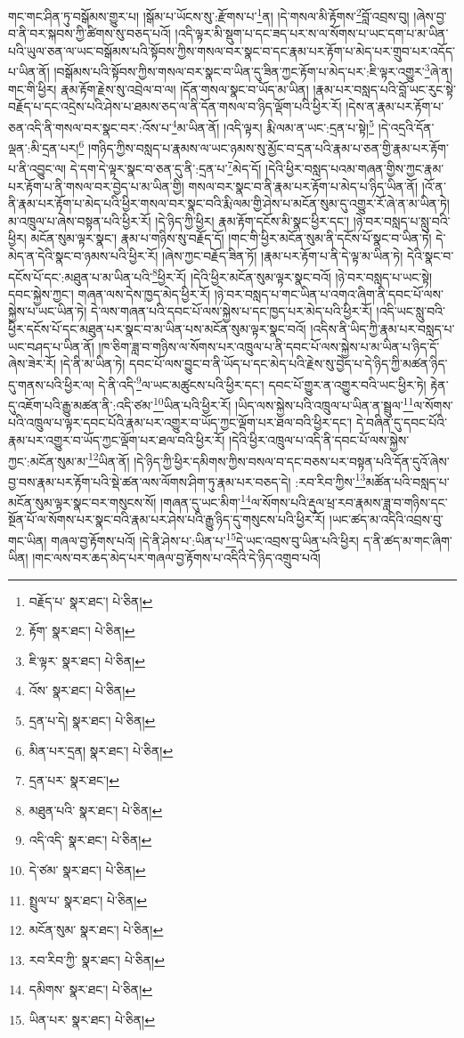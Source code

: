 གང་གང་ཤིན་ཏུ་བསྒོམས་གྱུར་པ། །སྒོམ་པ་ཡོངས་སུ་:རྫོགས་པ་\footnote{བརྗོད་པ་  སྣར་ཐང་།  པེ་ཅིན། }ན། །དེ་གསལ་མི་རྟོགས་\footnote{རྟོག་  སྣར་ཐང་།  པེ་ཅིན། }བློ་འབྲས་བུ། །ཞེས་བྱ་བ་ནི་བར་སྐབས་ཀྱི་ཚིགས་སུ་བཅད་པའོ། །འདི་ལྟར་མི་སྡུག་པ་དང་ཟད་པར་ས་ལ་སོགས་པ་ཡང་དག་པ་མ་ཡིན་པའི་ཡུལ་ཅན་ལ་ཡང་བསྒོམས་པའི་སྟོབས་ཀྱིས་གསལ་བར་སྣང་བ་དང་རྣམ་པར་རྟོག་པ་མེད་པར་གྲུབ་པར་འདོད་པ་ཡིན་ནོ། །བསྒོམས་པའི་སྟོབས་ཀྱིས་གསལ་བར་སྣང་བ་ཡིན་དུ་ཟིན་ཀྱང་རྟོག་པ་མེད་པར་:ཇི་ལྟར་འགྱུར་\footnote{ཇི་ལྟར་  སྣར་ཐང་།  པེ་ཅིན། }ཞེ་ན། གང་གི་ཕྱིར། རྣམ་རྟོག་རྗེས་སུ་འབྲེལ་བ་ལ། །དོན་གསལ་སྣང་བ་ཡོད་མ་ཡིན། །རྣམ་པར་བསླད་པའི་བློ་ཡང་རུང་སྟེ་བརྗོད་པ་དང་འདྲེས་པའི་ཤེས་པ་ཐམས་ཅད་ལ་ནི་དོན་གསལ་བ་ཉིད་ལྡོག་པའི་ཕྱིར་རོ། །དེས་ན་རྣམ་པར་རྟོག་པ་ཅན་འདི་ནི་གསལ་བར་སྣང་བར་:འོས་པ་\footnote{འོས་  སྣར་ཐང་།  པེ་ཅིན། }མ་ཡིན་ནོ། །འདི་ལྟར། རྨི་ལམ་ན་ཡང་:དྲན་པ་སྟེ།\footnote{དྲན་པ་དེ།  སྣར་ཐང་།  པེ་ཅིན། } །དེ་འདྲའི་དོན་ལྡན་:མི་དྲན་པར།\footnote{མིན་པར་དྲན།  སྣར་ཐང་།  པེ་ཅིན། } །གཉིད་ཀྱིས་བསླད་པ་རྣམས་ལ་ཡང་ཉམས་སུ་མྱོང་བ་དྲན་པའི་རྣམ་པ་ཅན་གྱི་རྣམ་པར་རྟོག་པ་ནི་འབྱུང་ལ། དེ་དག་དེ་ལྟར་སྣང་བ་ཅན་དུ་ནི་:དྲན་པ་\footnote{དྲན་པར་  སྣར་ཐང་། }མེད་དོ། །དེའི་ཕྱིར་བསླད་པའམ་གཞན་གྱིས་ཀྱང་རྣམ་པར་རྟོག་པ་ནི་གསལ་བར་བྱེད་པ་མ་ཡིན་གྱི། གསལ་བར་སྣང་བ་ནི་རྣམ་པར་རྟོག་པ་མེད་པ་ཉིད་ཡིན་ནོ། །འོ་ན་ནི་རྣམ་པར་རྟོག་པ་མེད་པའི་ཕྱིར་གསལ་བར་སྣང་བའི་རྨི་ལམ་གྱི་ཤེས་པ་མངོན་སུམ་དུ་འགྱུར་རོ་ཞེ་ན་མ་ཡིན་ཏེ། མ་འཁྲུལ་པ་ཞེས་བསྟན་པའི་ཕྱིར་རོ། །དེ་ཉིད་ཀྱི་ཕྱིར། རྣམ་རྟོག་དངོས་མི་སྣང་ཕྱིར་དང་། །ཉེ་བར་བསླད་པ་སླུ་བའི་ཕྱིར། མངོན་སུམ་ལྟར་སྣང་། རྣམ་པ་གཉིས་སུ་བརྗོད་དོ། །གང་གི་ཕྱིར་མངོན་སུམ་ནི་དངོས་པོ་སྣང་བ་ཡིན་ཏེ། དེ་མེད་ན་དེའི་སྣང་བ་ཉམས་པའི་ཕྱིར་རོ། །ཞེས་ཀྱང་བརྗོད་ཟིན་ཏོ། །རྣམ་པར་རྟོག་པ་ནི་དེ་ལྟ་མ་ཡིན་ཏེ། དེའི་སྣང་བ་དངོས་པོ་དང་:མཐུན་པ་མ་ཡིན་པའི་\footnote{མཐུན་པའི་  སྣར་ཐང་།  པེ་ཅིན། }ཕྱིར་རོ། །དེའི་ཕྱིར་མངོན་སུམ་ལྟར་སྣང་བའོ། །ཉེ་བར་བསླད་པ་ཡང་སྟེ། དབང་སྐྱེས་ཀྱང་། གཞན་ལས་དེས་ཁྱད་མེད་ཕྱིར་རོ། །ཉེ་བར་བསླད་པ་གང་ཡིན་པ་འགའ་ཞིག་ནི་དབང་པོ་ལས་སྐྱེས་པ་ཡང་ཡིན་ཏེ། དེ་ལས་གཞན་པའི་དབང་པོ་ལས་སྐྱེས་པ་དང་ཁྱད་པར་མེད་པའི་ཕྱིར་རོ། །འདི་ཡང་སླུ་བའི་ཕྱིར་དངོས་པོ་དང་མཐུན་པར་སྣང་བ་མ་ཡིན་པས་མངོན་སུམ་ལྟར་སྣང་བའོ། །འདིས་ནི་ཡིད་ཀྱི་རྣམ་པར་བསླད་པ་ཡང་བཤད་པ་ཡིན་ནོ། །ཁ་ཅིག་ཟླ་བ་གཉིས་ལ་སོགས་པར་འཁྲུལ་པ་ནི་དབང་པོ་ལས་སྐྱེས་པ་མ་ཡིན་པ་ཉིད་དོ་ཞེས་ཟེར་རོ། །དེ་ནི་མ་ཡིན་ཏེ། དབང་པོ་ལས་བྱུང་བ་ནི་ཡོད་པ་དང་མེད་པའི་རྗེས་སུ་བྱེད་པ་དེ་ཉིད་ཀྱི་མཚན་ཉིད་དུ་གནས་པའི་ཕྱིར་ལ། དེ་ནི་འདི་\footnote{འདི་འདི་  སྣར་ཐང་།  པེ་ཅིན། }ལ་ཡང་མཚུངས་པའི་ཕྱིར་དང་། དབང་པོ་གྱུར་ན་འགྱུར་བའི་ཡང་ཕྱིར་ཏེ། རྟེན་དུ་འཇོག་པའི་རྒྱུ་མཚན་ནི་:འདི་ཙམ་\footnote{དེ་ཙམ་  སྣར་ཐང་།  པེ་ཅིན། }ཡིན་པའི་ཕྱིར་རོ། །ཡིད་ལས་སྐྱེས་པའི་འཁྲུལ་པ་ཡིན་ན་སྦྲུལ་\footnote{སྤྲུལ་པ་  སྣར་ཐང་།  པེ་ཅིན། }ལ་སོགས་པའི་འཁྲུལ་པ་ལྟར་དབང་པོའི་རྣམ་པར་འགྱུར་བ་ཡོད་ཀྱང་ལྡོག་པར་ཐལ་བའི་ཕྱིར་དང་། དེ་བཞིན་དུ་དབང་པོའི་རྣམ་པར་འགྱུར་བ་ཡོད་ཀྱང་ལྡོག་པར་ཐལ་བའི་ཕྱིར་རོ། །དེའི་ཕྱིར་འཁྲུལ་པ་འདི་ནི་དབང་པོ་ལས་སྐྱེས་ཀྱང་:མངོན་སུམ་མ་\footnote{མངོན་སུམ་  སྣར་ཐང་།  པེ་ཅིན། }ཡིན་ནོ། །དེ་ཉིད་ཀྱི་ཕྱིར་དམིགས་ཀྱིས་བསལ་བ་དང་བཅས་པར་བསྟན་པའི་དོན་དུའོ་ཞེས་བྱ་བས་རྣམ་པར་རྟོག་པའི་སྡེ་ཚན་ལས་ལོགས་ཤིག་ཏུ་རྣམ་པར་བཅད་དེ། :རབ་རིབ་ཀྱིས་\footnote{རབ་རིབ་ཀྱི་  སྣར་ཐང་།  པེ་ཅིན། }མཚོན་པའི་བསླད་པ་མངོན་སུམ་ལྟར་སྣང་བར་གསུངས་སོ། །གཞན་དུ་ཡང་མིག་\footnote{དམིགས་  སྣར་ཐང་།  པེ་ཅིན། }ལ་སོགས་པའི་རྡུལ་ཕྲ་རབ་རྣམས་ཟླ་བ་གཉིས་དང་སྔོན་པོ་ལ་སོགས་པར་སྣང་བའི་རྣམ་པར་ཤེས་པའི་རྒྱུ་ཉིད་དུ་གསུངས་པའི་ཕྱིར་རོ། །ཡང་ཚད་མ་འདིའི་འབྲས་བུ་གང་ཡིན། གཞལ་བྱ་རྟོགས་པའོ། །དེ་ནི་ཤེས་པ་:ཡིན་པ་\footnote{ཡིན་པར་  སྣར་ཐང་།  པེ་ཅིན། }དེ་ཡང་འབྲས་བུ་ཡིན་པའི་ཕྱིར། ད་ནི་ཚད་མ་གང་ཞིག་ཡིན། །གང་ལས་བར་ཆད་མེད་པར་གཞལ་བྱ་རྟོགས་པ་འདིའི་དེ་ཉིད་འགྲུབ་པའོ། 